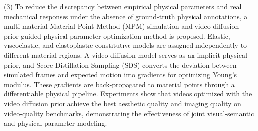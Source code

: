 \begin{engabstract}
    (3) To reduce the discrepancy between empirical physical parameters and real mechanical responses under the absence of ground-truth physical annotations, a multi-material Material Point Method (MPM) simulation and video-diffusion-prior-guided physical-parameter optimization method is proposed. Elastic, viscoelastic, and elastoplastic constitutive models are assigned independently to different material regions. A video diffusion model serves as an implicit physical prior, and Score Distillation Sampling (SDS) converts the deviation between simulated frames and expected motion into gradients for optimizing Young's modulus. These gradients are back-propagated to material points through a differentiable physical pipeline. Experiments show that videos optimized with the video diffusion prior achieve the best aesthetic quality and imaging quality on video-quality benchmarks, demonstrating the effectiveness of joint visual-semantic and physical-parameter modeling.

\end{engabstract}
